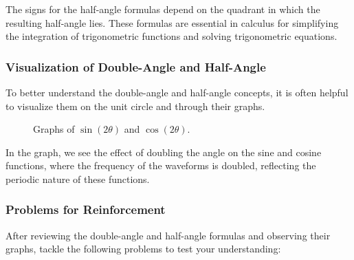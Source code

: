 \documentclass[a4paper,12pt]{book}
\newcounter{problem}
\begin{document}
The signs for the half-angle formulas depend on the quadrant in which the resulting half-angle lies. These formulas are essential in calculus for simplifying the integration of trigonometric functions and solving trigonometric equations.

\subsubsection{Visualization of Double-Angle and Half-Angle}
\label{subsubsec:visualization_double_half_angle}

To better understand the double-angle and half-angle concepts, it is often helpful to visualize them on the unit circle and through their graphs.

\begin{figure}[H]
\centering
{}
\caption{Graphs of $\sin(2\theta)$ and $\cos(2\theta)$.}
\end{figure}

In the graph, we see the effect of doubling the angle on the sine and cosine functions, where the frequency of the waveforms is doubled, reflecting the periodic nature of these functions.

\subsubsection{Problems for Reinforcement}
\label{subsubsec:problems_double_half_angle}
After reviewing the double-angle and half-angle formulas and observing their graphs, tackle the following problems to test your understanding:
\end{document}
